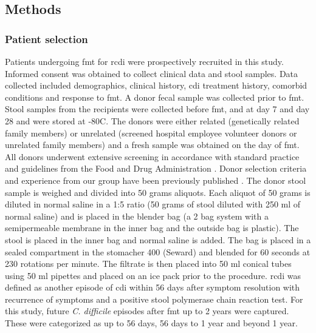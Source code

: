 \subsection{Methods}
\subsubsection{Patient selection}
Patients undergoing \gls{fmt} for \gls{rcdi} were prospectively recruited in this study. Informed consent was obtained to collect clinical data and stool samples. Data collected included demographics, clinical history, \gls{cdi} treatment history, comorbid conditions and response to \gls{fmt}. A donor fecal sample was collected prior to \gls{fmt}. Stool samples from the recipients were collected before \gls{fmt}, and at day 7 and day 28 and were stored at -80\textdegree C. The donors were either related (genetically related family members) or unrelated (screened hospital employee volunteer donors or unrelated family members) and a fresh sample was obtained on the day of \gls{fmt}. All donors underwent extensive screening in accordance with standard practice and guidelines from the Food and Drug Administration \cite{RN1446}. Donor selection criteria and experience from our group have been previously published \cite{RN1523}. The donor stool sample is weighed and divided into 50 grams aliquots. Each aliquot of 50 grams is diluted in normal saline in a 1:5 ratio (50 grams of stool diluted with 250 ml of normal saline) and is placed in the blender bag (a 2 bag system with a semipermeable membrane in the inner bag and the outside bag is plastic). The stool is placed in the inner bag and normal saline is added. The bag is placed in a sealed compartment in the stomacher 400 (Seward) and blended for 60 seconds at 230 rotations per minute. The filtrate is then placed into 50 ml conical tubes using 50 ml pipettes and placed on an ice pack prior to the procedure.  \Gls{rcdi} was defined as another episode of \gls{cdi} within 56 days after symptom resolution with recurrence of symptoms and a positive stool polymerase chain reaction test. For this study, future \textit{C. difficile} episodes after \gls{fmt} up to 2 years were captured. These were categorized as up to 56 days, 56 days to 1 year and beyond 1 year. 

